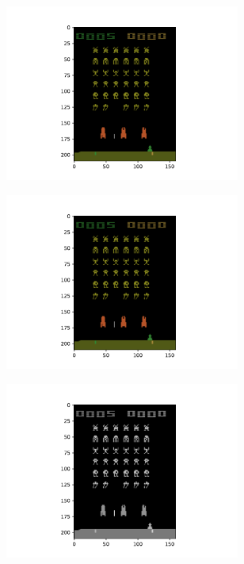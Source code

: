 \begin{figure}[tbp!]
    \begin{subfigure}[b]{0.32\textwidth}
        \centering
        \includegraphics[height=5.8cm]{graphics/atari-pre-processing/1-spaceinvaders-original-cropped.pdf}
        \caption{}
        \label{fig: Experimental work: atari-pre-processing-1-spaceinvaders-original}
    \end{subfigure}
    \hfill
    \begin{subfigure}[b]{0.32\textwidth}
        \centering
        \includegraphics[height=5.8cm]{graphics/atari-pre-processing/2-spaceinvaders-flicker-cropped.pdf}
        \caption{}
    \label{fig: Experimental work: atari-pre-processing-2-spaceinvaders-flicker}
    \end{subfigure}
    \hfill
    \begin{subfigure}[b]{0.32\textwidth}
        \centering
        \includegraphics[height=5.8cm]{graphics/atari-pre-processing/3-spaceinvaders-grey-cropped.pdf}

\end{subfigure}
\end{figure}
